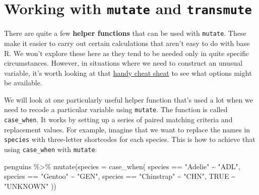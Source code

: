 \documentclass[
]{book}
\newenvironment{Shaded}{\begin{snugshade}}{\end{snugshade}}
\newcommand{\AttributeTok}[1]{\textcolor[rgb]{0.77,0.63,0.00}{#1}}
\newcommand{\ConstantTok}[1]{\textcolor[rgb]{0.00,0.00,0.00}{#1}}
\newcommand{\FunctionTok}[1]{\textcolor[rgb]{0.00,0.00,0.00}{#1}}
\newcommand{\NormalTok}[1]{#1}
\newcommand{\SpecialCharTok}[1]{\textcolor[rgb]{0.00,0.00,0.00}{#1}}
\newcommand{\StringTok}[1]{\textcolor[rgb]{0.31,0.60,0.02}{#1}}
\begin{document}
\hypertarget{working-with-mutate-and-transmute}{%
\section{\texorpdfstring{Working with \texttt{mutate} and \texttt{transmute}}{Working with mutate and transmute}}\label{working-with-mutate-and-transmute}}

There are quite a few \textbf{helper functions} that can be used with \texttt{mutate}. These make it easier to carry out certain calculations that aren't easy to do with base R. We won't explore these here as they tend to be needed only in quite specific circumstances. However, in situations where we need to construct an unusual variable, it's worth looking at that \href{https://github.com/rstudio/cheatsheets/raw/master/data-transformation.pdf}{handy cheat sheat} to see what options might be available.

We will look at one particularly useful helper function that's used a lot when we need to recode a particular variable using \texttt{mutate}. The function is called \texttt{case\_when}. It works by setting up a series of paired matching criteria and replacement values. For example, imagine that we want to replace the names in \texttt{species} with three-letter shortcodes for each species. This is how to achieve that using \texttt{case\_when} with \texttt{mutate}:

\begin{Shaded}
\begin{Highlighting}[]
\NormalTok{penguins }\SpecialCharTok{\%\textgreater{}\%} 
  \FunctionTok{mutate}\NormalTok{(}\AttributeTok{species =} \FunctionTok{case\_when}\NormalTok{(}
\NormalTok{           species }\SpecialCharTok{==} \StringTok{"Adelie"}    \SpecialCharTok{\textasciitilde{}} \StringTok{"ADL"}\NormalTok{,}
\NormalTok{           species }\SpecialCharTok{==} \StringTok{"Gentoo"}    \SpecialCharTok{\textasciitilde{}} \StringTok{"GEN"}\NormalTok{,}
\NormalTok{           species }\SpecialCharTok{==} \StringTok{"Chinstrap"} \SpecialCharTok{\textasciitilde{}} \StringTok{"CHN"}\NormalTok{,}
           \ConstantTok{TRUE} \SpecialCharTok{\textasciitilde{}} \StringTok{"UNKNOWN"}
\NormalTok{         )) }
\end{Highlighting}
\end{Shaded}
\end{document}
